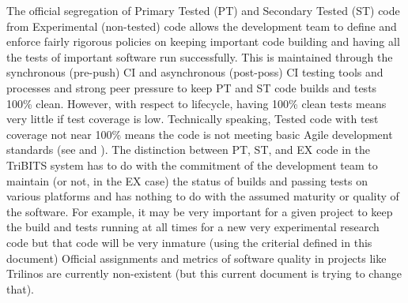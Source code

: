 \documentclass[11pt]{SANDreport}
\begin{document}
The official segregation of Primary Tested (PT) and Secondary Tested (ST) code from Experimental (non-tested) code allows the development team to define and enforce fairly rigorous policies on keeping important code building and having all the tests of important software run successfully.  This is maintained through the synchronous (pre-push) CI and asynchronous (post-poss) CI testing tools and processes and strong peer pressure to keep PT and ST code builds and tests 100\% clean.  However, with respect to lifecycle, having 100\% clean tests means very little if test coverage is low.  Technically speaking, Tested code with test coverage not near 100\% means the code is not meeting basic Agile development standards (see {}\cite{XP2} and {}\cite{CodeComplete2nd04}).  The distinction between PT, ST, and EX code in the TriBITS system has to do with the commitment of the development team to maintain (or not, in the EX case) the status of builds and passing tests on various platforms and has nothing to do with the assumed maturity or quality of the software.  For example, it may be very important for a given project to keep the build and tests running at all times for a new very experimental research code but that code will be very inmature (using the criterial defined in this document)  Official assignments and metrics of software quality in projects like Trilinos are currently non-existent (but this current document is trying to change that).

\begin{figure}
\begin{center}
\end{center}
\end{figure}
\end{document}
